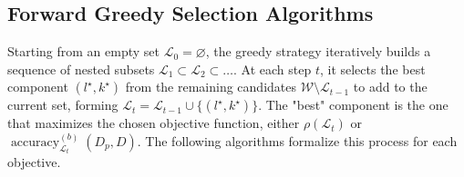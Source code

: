 \subsection{Forward Greedy Selection Algorithms}
Starting from an empty set $\mathcal{L}_0=\varnothing$, the greedy strategy iteratively builds a sequence of nested subsets $\mathcal{L}_1 \subset \mathcal{L}_2 \subset \dots$. At each step $t$, it selects the best component $(l^\star,k^\star)$ from the remaining candidates $\mathcal{W}\setminus\mathcal{L}_{t-1}$ to add to the current set, forming $\mathcal{L}_t = \mathcal{L}_{t-1} \cup \{(l^\star,k^\star)\}$. The "best" component is the one that maximizes the chosen objective function, either $\rho(\mathcal{L}_t)$ or $\operatorname{accuracy}^{(b)}_{\mathcal{L}_t}(D_p,D)$. The following algorithms formalize this process for each objective.

